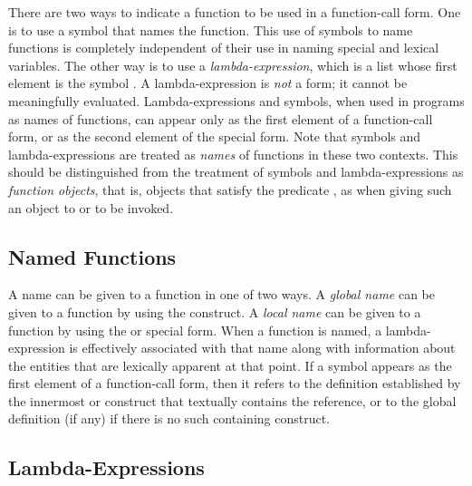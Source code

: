 There are two ways to indicate a function to be used in a function-call
form.  One is to use a symbol that names the function.  This use of
symbols to name functions is completely independent of their use in
naming special and lexical variables.  The other way is to use a
\textit{lambda-expression}, which is a list whose first element is the symbol
.  A lambda-expression is \textit{not} a form; it cannot be
meaningfully evaluated.  Lambda-expressions and symbols, when used in
programs as names of functions, can appear only as the first element of a
function-call form, or as the second element of the 
special form.  Note that symbols and lambda-expressions are treated as
\textit{names} of functions in these two contexts.  This should be
distinguished from the treatment of symbols and lambda-expressions as
\textit{function objects}, that is,
objects that satisfy the predicate ,
as when giving such an object to  or  to be
invoked.

\subsection{Named Functions}

A name can be given to a function in one of two ways.
A \textit{global name} can be given to a function by using the
 construct.
A \textit{local name} can be given to a function by using the
 or
 special form.
When a function is named, a lambda-expression is effectively
associated with that name
along with information about the entities that are lexically apparent
at that point.
If a symbol appears as the first element of a function-call form, then it
refers to the definition established by the innermost  or 
construct that textually contains the reference, or to the global
definition (if any) if there is no such containing construct.

\subsection{Lambda-Expressions}
\label{LAMBDA-EXPRESSIONS-SECTION}

